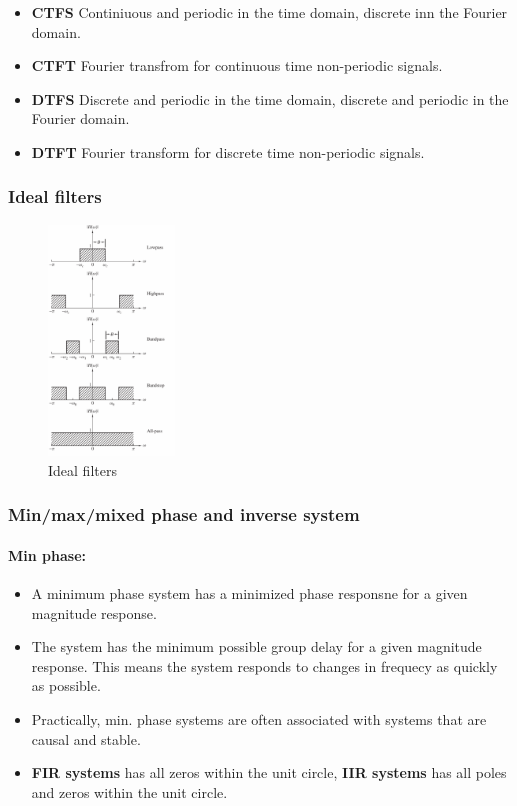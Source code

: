 \documentclass{article}
\begin{document}
\begin{itemize}
    \item \textbf{CTFS} Continiuous and periodic in the time domain, discrete inn the Fourier domain.
    \item \textbf{CTFT} Fourier transfrom for continuous time non-periodic signals.
    \item \textbf{DTFS} Discrete and periodic in the time domain, discrete and periodic in the Fourier domain.
    \item \textbf{DTFT} Fourier transform for discrete time non-periodic signals.
\end{itemize}

\clearpage

\subsubsection{Ideal filters}

\begin{figure}[h!]
    \centering
    \includegraphics[width=0.3\textwidth]{figures/DFT/ideal_filters.png}
    \caption{Ideal filters}
    \label{fig:ideal_filters}
\end{figure}


\subsubsection{Min/max/mixed phase and inverse system}
\paragraph{Min phase:}
\begin{itemize}
    \item A minimum phase system has a minimized phase responsne for a given magnitude response.
    \item The system has the minimum possible group delay for a given magnitude response. This means the system responds to changes in frequecy as quickly as possible.
    \item Practically, min. phase systems are often associated with systems that are causal and stable.
    \item \textbf{FIR systems} has all zeros within the unit circle, \textbf{IIR systems} has all poles and zeros within the unit circle.
\end{itemize}
\end{document}
